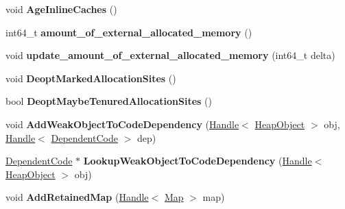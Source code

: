 \begin{DoxyCompactItemize}
\item 
void {\bfseries Age\+Inline\+Caches} ()\hypertarget{classv8_1_1internal_1_1_heap_a834c7def5163a4cecdd704dcfb0d858b}{}\label{classv8_1_1internal_1_1_heap_a834c7def5163a4cecdd704dcfb0d858b}

\item 
int64\+\_\+t {\bfseries amount\+\_\+of\+\_\+external\+\_\+allocated\+\_\+memory} ()\hypertarget{classv8_1_1internal_1_1_heap_a2ff3cb2cf4f7b005ce181ccab7bf5b90}{}\label{classv8_1_1internal_1_1_heap_a2ff3cb2cf4f7b005ce181ccab7bf5b90}

\item 
void {\bfseries update\+\_\+amount\+\_\+of\+\_\+external\+\_\+allocated\+\_\+memory} (int64\+\_\+t delta)\hypertarget{classv8_1_1internal_1_1_heap_a9a23eeac6f5ed029c6b14aa3506d656d}{}\label{classv8_1_1internal_1_1_heap_a9a23eeac6f5ed029c6b14aa3506d656d}

\item 
void {\bfseries Deopt\+Marked\+Allocation\+Sites} ()\hypertarget{classv8_1_1internal_1_1_heap_a132b382007ad151c90cd99fc31bab9b5}{}\label{classv8_1_1internal_1_1_heap_a132b382007ad151c90cd99fc31bab9b5}

\item 
bool {\bfseries Deopt\+Maybe\+Tenured\+Allocation\+Sites} ()\hypertarget{classv8_1_1internal_1_1_heap_ac618282e0af0edb026421bec9c9f12b1}{}\label{classv8_1_1internal_1_1_heap_ac618282e0af0edb026421bec9c9f12b1}

\item 
void {\bfseries Add\+Weak\+Object\+To\+Code\+Dependency} (\hyperlink{classv8_1_1internal_1_1_handle}{Handle}$<$ \hyperlink{classv8_1_1internal_1_1_heap_object}{Heap\+Object} $>$ obj, \hyperlink{classv8_1_1internal_1_1_handle}{Handle}$<$ \hyperlink{classv8_1_1internal_1_1_dependent_code}{Dependent\+Code} $>$ dep)\hypertarget{classv8_1_1internal_1_1_heap_a04ac90a67312ea379ad0b5b2f34dc97f}{}\label{classv8_1_1internal_1_1_heap_a04ac90a67312ea379ad0b5b2f34dc97f}

\item 
\hyperlink{classv8_1_1internal_1_1_dependent_code}{Dependent\+Code} $\ast$ {\bfseries Lookup\+Weak\+Object\+To\+Code\+Dependency} (\hyperlink{classv8_1_1internal_1_1_handle}{Handle}$<$ \hyperlink{classv8_1_1internal_1_1_heap_object}{Heap\+Object} $>$ obj)\hypertarget{classv8_1_1internal_1_1_heap_ae5871c83045d05f089e8399cf0bdedb8}{}\label{classv8_1_1internal_1_1_heap_ae5871c83045d05f089e8399cf0bdedb8}

\item 
void {\bfseries Add\+Retained\+Map} (\hyperlink{classv8_1_1internal_1_1_handle}{Handle}$<$ \hyperlink{classv8_1_1internal_1_1_map}{Map} $>$ map)\hypertarget{classv8_1_1internal_1_1_heap_adf1811f300306185a8433c1781572ab0}{}\label{classv8_1_1internal_1_1_heap_adf1811f300306185a8433c1781572ab0}


\end{DoxyCompactItemize}
